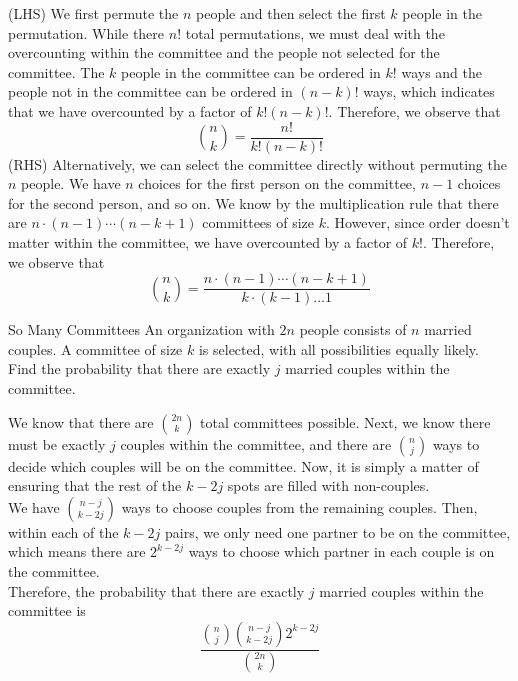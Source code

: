 \documentclass[11pt]{article}
\begin{document}
\begin{solution}{4}
\begin{enumerate}
    (LHS) We first permute the $n$ people and then
    select the first $k$ people in the
    permutation. While there $n!$ total permutations,
    we must deal with the overcounting within
    the committee and the people not selected
    for the committee. The $k$ people in the 
    committee can be ordered in $k!$ ways 
    and the people not in the committee can
    be ordered in $(n-k)!$ ways, which indicates that we have overcounted by a factor of $k!(n-k)!$.
    Therefore, we observe that 
        $${n \choose k} = \frac{n!}{k!(n-k)!}$$
    (RHS) Alternatively, we can select the 
    committee directly without permuting the $n$ 
    people. We have $n$ choices for the first
    person on the committee, $n-1$ choices 
    for the second person, and so on. We know
    by the multiplication rule that there
    are $n \cdot (n-1) \dotsm (n-k+1)$ committees
    of size $k$. However, since order doesn't matter
    within the committee, we have overcounted
    by a factor of $k!$. Therefore, we observe
    that
        $${n\choose k} = \frac{n \cdot (n-1) \dotsm (n-k+1)}{k \cdot(k-1)\dots1}$$
\end{enumerate}
\end{solution}

\begin{exercise}{So Many Committees}
An organization with $2n$ people consists of $n$ married couples. A committee of size $k$ is selected, with all possibilities equally likely. Find the probability that there are exactly $j$ married couples within the committee.
\end{exercise}

\begin{solution}{2.5}
We know that there are ${2n \choose k}$ total committees possible. Next, we know there must be exactly $j$ couples within the committee, and there are ${n \choose j}$ ways to decide which couples will be on the committee. Now, it is simply a matter of ensuring that the rest of the $k-2j$ spots are filled with non-couples. \\

We have ${n-j \choose k-2j}$ ways to choose couples from the remaining couples. Then, within each of the $k-2j$ pairs, we only need one partner to be on the committee, which means there are $2^{k-2j}$ ways to choose which partner in each couple is on the committee. \\

Therefore, the probability that there are exactly $j$ married couples within the committee is 
    $$\frac{{n \choose j} {n-j \choose k-2j} 2^{k-2j}}{{\binom{2n} {k}}}$$
\end{solution}
\end{document}
